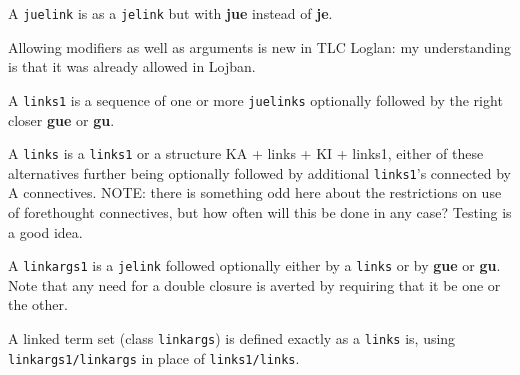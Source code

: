\documentclass[12pt]{book}
\begin{document}
A {\tt juelink} is as a {\tt jelink} but with {\bf jue} instead of {\bf je}.

Allowing modifiers as well as arguments is new in TLC Loglan:  my understanding is that it was already allowed in Lojban.

A {\tt links1} is a sequence of one or more {\tt juelinks} optionally followed by the right closer {\bf gue} or {\bf gu}.

A {\tt links} is a {\tt links1} or a structure  KA + links + KI  + links1, either of these alternatives further being optionally followed by additional {\tt links1}'s
connected by A connectives.  NOTE:  there is something odd here about the restrictions on use of forethought connectives, but how often will this be done in any case?  Testing is a good idea.

A {\tt linkargs1} is a {\tt jelink} followed optionally either by a {\tt links} or by {\bf gue} or {\bf gu}.  Note that any need for a double closure is averted by requiring that it be one or the other.

A linked term set (class {\tt linkargs}) is defined exactly as a {\tt links} is, using {\tt linkargs1/linkargs} in place of {\tt links1/links}.
\end{document}
